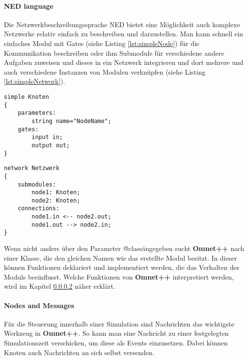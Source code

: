 \paragraph{NED language\cite{ned}}

Die Netzwerkbeschreibungssprache NED bietet eine Möglichkeit auch komplexe Netzwerke relativ einfach zu beschreiben und darzustellen. Man kann schnell ein einfaches Modul mit Gates (siehe Listing \ref{lst:simpleNode}) für die Kommunikation beschreiben oder ihm Submodule für verschiedene andere Aufgaben zuweisen und dieses in ein Netzwerk integrieren und dort mehrere und auch verschiedene Instanzen von Modulen verknüpfen (siehe Listing \ref{lst:simpleNetwork}). 

\begin{minipage}{\textwidth}
\begin{lstlisting}[language=ned,caption={einfacher Beispielknoten},label=lst:simpleNode]
simple Knoten
{
	parameters:
		string name="NodeName";
	gates:
		input in;
		output out;
}
\end{lstlisting}
\end{minipage}

\begin{minipage}{\textwidth}
\begin{lstlisting}[language=ned,caption={einfaches Netzwerk},label=lst:simpleNetwork]
network Netzwerk
{
	submodules:
		node1: Knoten;
		node2: Knoten;
	connections:
		node1.in <-- node2.out;
		node1.out --> node2.in;
}
\end{lstlisting}
\end{minipage}

Wenn nicht anders über den Parameter \"@class\" angegeben sucht \textbf{Omnet++} nach einer Klasse, die den gleichen Namen wie das erstellte Modul besitzt. In dieser können Funktionen deklariert und implementiert werden, die das Verhalten des Moduls beeinflusst. Welche Funktionen von \textbf{Omnet++} interpretiert werden, wird im Kapitel \ref{para:Nodes and Messages} näher erklärt.

\paragraph{Nodes and Messages}\label{para:Nodes and Messages}

Für die Steuerung innerhalb einer Simulation sind Nachrichten das wichtigste Werkzeug in \textbf{Omnet++}. So kann man eine Nachricht zu einer festgelegten Simulationszeit verschicken, um diese als Events einzusetzen. Dabei können Knoten auch Nachrichten an sich selbst versenden.

